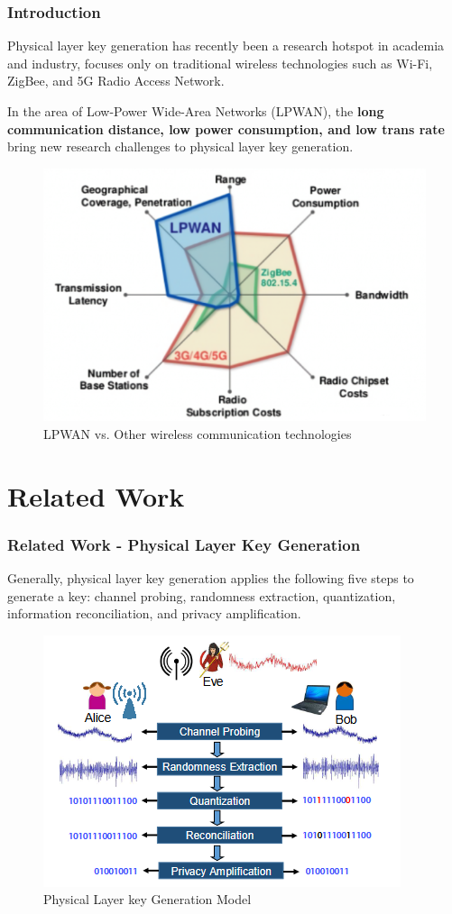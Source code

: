 \documentclass{beamer}
\begin{document}
\begin{frame}
\frametitle{Introduction}
  
Physical layer key generation has recently been a research hotspot in academia and industry\cite{7120014}, focuses only on traditional wireless  technologies such as Wi-Fi, ZigBee, and 5G Radio Access Network. 

In the area of Low-Power Wide-Area Networks (LPWAN)\cite{iotfactorylpwan}, the \textbf{long communication distance, low power consumption, and low trans rate} bring new research challenges to physical layer key generation.
  
  \begin{figure}
    \centering
    \includegraphics[width=0.42\linewidth]{../figures/fig1-1.png}
    \caption{LPWAN vs. Other wireless communication technologies\cite{iotfactorylpwan}}
    \label{fig:1-1}
  \end{figure}
\end{frame}



\section{Related Work}

\begin{frame}
\frametitle{Related Work - Physical Layer Key Generation}
Generally, physical layer key generation applies the following five steps to generate a key: channel probing, randomness extraction, quantization, information reconciliation, and privacy amplification\cite{7120014}.
\begin{figure}
  \centering
  \includegraphics[width=0.6\linewidth]{../figures/fig2-1.png}
  \caption{Physical Layer key Generation Model\cite{7120014}}
  \label{fig:phykegen}
\end{figure}

\end{frame}
\end{document}
